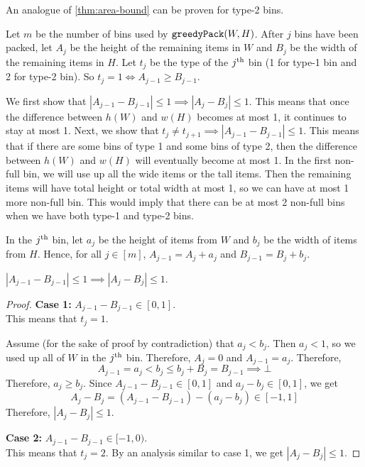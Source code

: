 An analogue of \cref{thm:area-bound} can be proven for type-2 bins.

Let $m$ be the number of bins used by $\operatorname{\mathtt{greedyPack}}(W, H)$.
After $j$ bins have been packed, let $A_j$ be the height of the remaining items in $W$
and $B_j$ be the width of the remaining items in $H$.
Let $t_j$ be the type of the $j^{\textrm{th}}$ bin (1 for type-1 bin and 2 for type-2 bin).
So $t_j = 1 \iff A_{j-1} \ge B_{j-1}$.

We first show that $|A_{j-1} - B_{j-1}| \le 1 \implies |A_j - B_j| \le 1$.
This means that once the difference between $h(W)$ and $w(H)$ becomes at most 1,
it continues to stay at most 1.
Next, we show that $t_j \neq t_{j+1} \implies |A_{j-1} - B_{j-1}| \le 1$.
This means that if there are some bins of type 1 and some bins of type 2,
then the difference between $h(W)$ and $w(H)$ will eventually become at most 1.
In the first non-full bin, we will use up all the wide items or the tall items.
Then the remaining items will have total height or total width at most 1,
so we can have at most 1 more non-full bin.
This would imply that there can be at most 2 non-full bins
when we have both type-1 and type-2 bins.

In the $j^{\textrm{th}}$ bin, let $a_j$ be the height of items from $W$
and $b_j$ be the width of items from $H$.
Hence, for all $j \in [m]$,
$A_{j-1} = A_j + a_j$ and $B_{j-1} = B_j + b_j$.

\begin{lemma}
\label{thm:diff-capture}
$|A_{j-1} - B_{j-1}| \le 1 \implies |A_j - B_j| \le 1$.
\end{lemma}
\begin{proof}
\textbf{Case 1:} $A_{j-1} - B_{j-1} \in [0, 1]$.
\\ This means that $t_j = 1$.

Assume (for the sake of proof by contradiction) that $a_j < b_j$.
Then $a_j < 1$, so we used up all of $W$ in the $j^{\textrm{th}}$ bin.
Therefore, $A_j = 0$ and $A_{j-1} = a_j$. Therefore,
\[ A_{j-1} = a_j < b_j \le b_j + B_j = B_{j-1} \implies \bot \]
Therefore, $a_j \ge b_j$. Since $A_{j-1} - B_{j-1} \in [0, 1]$
and $a_j - b_j \in [0, 1]$, we get
\[ A_j - B_j = (A_{j-1} - B_{j-1}) - (a_j - b_j) \in [-1, 1] \]
Therefore, $|A_j - B_j| \le 1$.

\textbf{Case 2:} $A_{j-1} - B_{j-1} \in [-1, 0)$.
\\ This means that $t_j = 2$.
By an analysis similar to case 1, we get $|A_j - B_j| \le 1$.
\end{proof}

